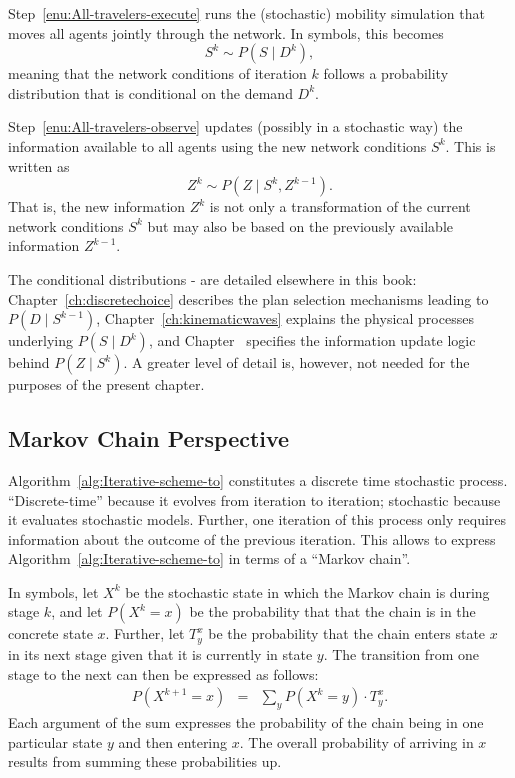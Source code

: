 Step~\ref{enu:All-travelers-execute} runs the (stochastic) mobility
simulation that moves all agents jointly through the network. In symbols,
this becomes
\begin{equation}
S^{k}\sim P(S\mid D^{k}),\label{eq:network-loading-model}
\end{equation}
meaning that the network conditions of iteration $k$ follows a probability
distribution that is conditional on the demand $D^{k}$. 

Step~\ref{enu:All-travelers-observe} updates (possibly in a stochastic
way) the information available to all agents using the new network
conditions $S^{k}$. This is written as
\begin{equation}
Z^{k}\sim P(Z\mid S^{k},Z^{k-1}).\label{eq:learning-model}
\end{equation}
That is, the new information $Z^{k}$ is not only a transformation
of the current network conditions $S^{k}$ but may also be based on
the previously available information $Z^{k-1}$.

The conditional distributions -
are detailed elsewhere in this book: Chapter~\ref{ch:discretechoice} 
describes the plan selection mechanisms leading to $P(D\mid S^{k-1})$,
Chapter~\ref{ch:kinematicwaves} explains the physical processes underlying
$P(S\mid D^{k})$, and Chapter~  specifies the information
update logic behind $P(Z\mid S^{k})$. A greater level of detail is,
however, not needed for the purposes of the present chapter.


\subsection{\label{sub:Markov-chain-perspective}Markov Chain Perspective}

Algorithm~\ref{alg:Iterative-scheme-to} constitutes a discrete time
stochastic process. {}``Discrete-time'' because it evolves from
iteration to iteration; stochastic because it evaluates stochastic
models. Further, one iteration of this process only requires information
about the outcome of the previous iteration. This allows to express
Algorithm~\ref{alg:Iterative-scheme-to} in terms of a {}``Markov
chain''. 

In symbols, let $X^{k}$ be the stochastic state in which the Markov
chain is during stage $k$, and let $P(X^{k}=x)$ be the probability
that that the chain is in the concrete state $x$. Further, let $T_{y}^{x}$
be the probability that the chain enters state $x$ in its next stage
given that it is currently in state $y$. The transition from one
stage to the next can then be expressed as follows:
\begin{eqnarray}
P(X^{k+1}=x) & = & \sum_{y}P(X^{k}=y)\cdot T_{y}^{x}.\label{eq:one-mc-transition}
\end{eqnarray}
Each argument of the sum expresses the probability of the chain being
in one particular state $y$ and then entering $x$. The overall probability
of arriving in $x$ results from summing these probabilities up.

